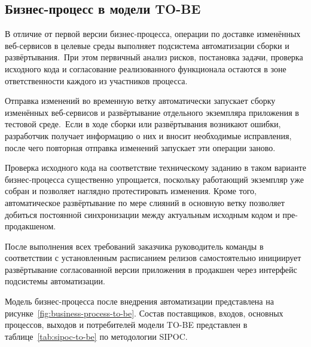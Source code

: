\subsection{Бизнес-процесс в модели TO-BE}\label{subsec:business-process-in-to-be-model}

В отличие от первой версии бизнес-процесса, операции по доставке изменённых веб-сервисов в целевые среды выполняет подсистема автоматизации сборки и развёртывания.\ При этом первичный анализ рисков, постановка задачи, проверка исходного кода и согласование реализованного функционала остаются в зоне ответственности каждого из участников процесса.

Отправка изменений во временную ветку автоматически запускает сборку изменённых веб-сервисов и развёртывание отдельного экземпляра приложения в тестовой среде.\ Если в ходе сборки или развёртывания возникают ошибки, разработчик получает информацию о них и вносит необходимые исправления, после чего повторная отправка изменений запускает эти операции заново.

Проверка исходного кода на соответствие техническому заданию в таком варианте бизнес-процесса существенно упрощается, поскольку работающий экземпляр уже собран и позволяет наглядно протестировать изменения. Кроме того, автоматическое развёртывание по мере слияний в основную ветку позволяет добиться постоянной синхронизации между актуальным исходным кодом и пре-продакшеном.

После выполнения всех требований заказчика руководитель команды в соответствии с установленным расписанием релизов самостоятельно инициирует развёртывание согласованной версии приложения в продакшен через интерфейс подсистемы автоматизации.

Модель бизнес-процесса после внедрения автоматизации представлена на рисунке~\ref{fig:business-process-to-be}. Состав поставщиков, входов, основных процессов, выходов и потребителей модели TO-BE представлен в таблице~\ref{tab:sipoc-to-be} по методологии SIPOC.
